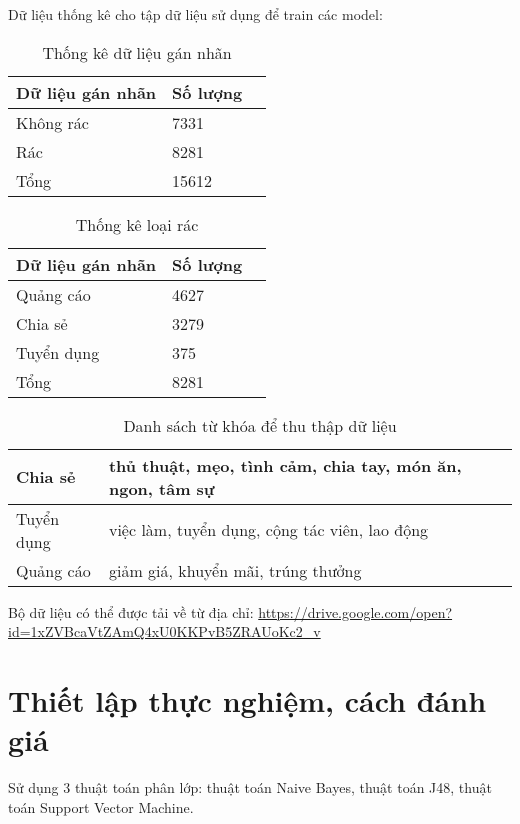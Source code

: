 Dữ liệu thống kê cho tập dữ liệu sử dụng để train các model:
	\begin{table}[H]
		\centering
		\setlength\extrarowheight{3pt}
		\begin{tabular}{|l|l|l|}
			\hline
			Dữ liệu gán nhãn & Số lượng \\
			\hline
			Không rác   & 7331\\
			\hline
			Rác   & 8281\\
			\hline
			\hline
			Tổng   & 15612\\
			\hline
		\end{tabular}%
		\caption{Thống kê dữ liệu gán nhãn} \label{tab:table_4_1}%
	\end{table}
	\begin{table}[H]
		\centering
		\setlength\extrarowheight{3pt}
		\begin{tabular}{|l|l|l|}
			\hline
			Dữ liệu gán nhãn & Số lượng \\
			\hline
			Quảng cáo   & 4627\\
			\hline
			Chia sẻ   & 3279\\
			\hline
			Tuyển dụng   & 375\\
			\hline
			\hline
			Tổng   & 8281\\
			\hline
		\end{tabular}%
		\caption{Thống kê loại rác} \label{tab:table_4_2}%
	\end{table}
	\begin{table}[H]
		\setlength\extrarowheight{3pt}
		\begin{tabular}{|p{4cm}|p{10cm}|}
			\hline
			Chia sẻ      & thủ thuật, mẹo, tình cảm, chia tay, món ăn, ngon, tâm sự \\
			\hline
			Tuyển dụng   & việc làm, tuyển dụng, cộng tác viên, lao động \\ 
			\hline
			Quảng cáo & giảm giá, khuyển mãi, trúng thưởng \\
			\hline
		\end{tabular}%
		\caption{Danh sách từ khóa để thu thập dữ liệu}
		\label{tab:twitterkeywords}%
	\end{table}%

Bộ dữ liệu có thể được tải về từ địa chỉ:
\url{https://drive.google.com/open?id=1xZVBcaVtZAmQ4xU0KKPvB5ZRAUoKc2_v}

\section{Thiết lập thực nghiệm, cách đánh giá}
Sử dụng 3 thuật toán phân lớp: thuật toán Naive Bayes, thuật toán J48, thuật toán Support Vector Machine. 

